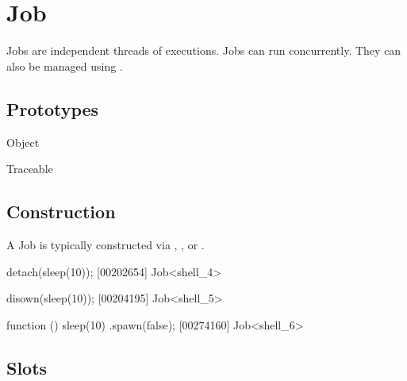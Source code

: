 
\section{Job}

Jobs are independent threads of executions.  Jobs can run concurrently.
They can also be managed using .

\subsection{Prototypes}

\begin{refObjects}
\item[Object]
\item[Traceable]
\end{refObjects}

\subsection{Construction}

A Job is typically constructed via ,
, or .

\begin{urbiscript}
detach(sleep(10));
[00202654] Job<shell_4>

disown(sleep(10));
[00204195] Job<shell_5>

function () { sleep(10) }.spawn(false);
[00274160] Job<shell_6>
\end{urbiscript}

\subsection{Slots}


